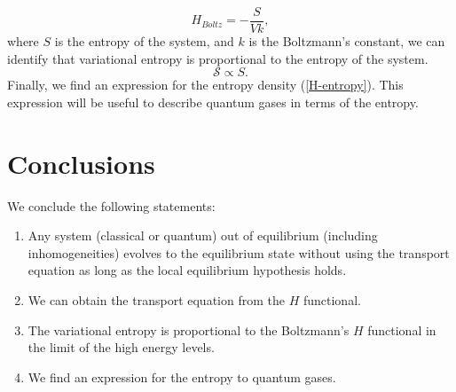 \documentclass{article}
\newcommand{\Ss}{\mathcal{S}}
\begin{document}
\begin{equation}
    H_{Boltz}=-\frac{S}{Vk},
\end{equation}
where $S$ is the entropy of the system, and $k$ is the Boltzmann's constant, we can identify that variational entropy is proportional to the entropy of the system.\\
\begin{equation}
    \Ss\propto S.
\end{equation}
Finally, we find an expression for the entropy density (\ref{H-entropy}). This expression will be useful to describe quantum gases in terms of the entropy.


\section{Conclusions}
We conclude the following statements:\\
\begin{enumerate}
    \item Any system (classical or quantum) out of equilibrium (including inhomogeneities) evolves to the equilibrium state without using the transport equation as long as the local equilibrium hypothesis holds.
    \item We can obtain the transport equation from the $H$ functional.
    \item The variational entropy is proportional to the Boltzmann's $H$ functional in the limit of the high energy levels.
    \item We find an expression for the entropy to quantum gases.
    \end{enumerate}
  
  
\clearpage
\end{document}
